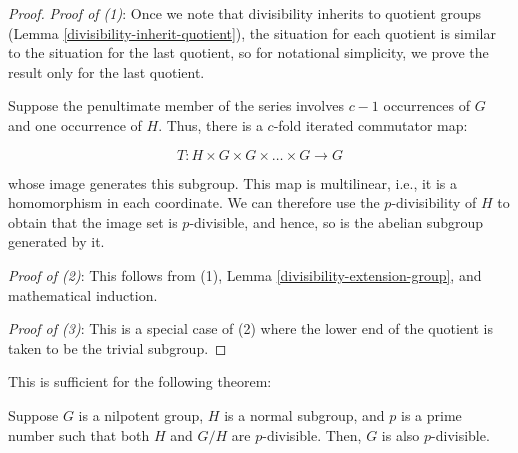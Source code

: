 \documentclass{ucetd}
\begin{document}
\begin{proof}
  {\em Proof of (1)}: Once we note that divisibility inherits to
  quotient groups (Lemma \ref{divisibility-inherit-quotient}), the
  situation for each quotient is similar to the situation for the last
  quotient, so for notational simplicity, we prove the result only for
  the last quotient.

  Suppose the penultimate member of the series involves $c - 1$
  occurrences of $G$ and one occurrence of $H$. Thus, there is a
  $c$-fold iterated commutator map:

  $$T: H \times G \times G \times \dots \times G \to G$$

  whose image generates this subgroup. This map is multilinear, i.e.,
  it is a homomorphism in each coordinate. We can therefore use the
  $p$-divisibility of $H$ to obtain that the image set is
  $p$-divisible, and hence, so is the abelian subgroup generated by
  it.

  {\em Proof of (2)}: This follows from (1), Lemma
  \ref{divisibility-extension-group}, and mathematical induction.

  {\em Proof of (3)}: This is a special case of (2) where the lower
  end of the quotient is taken to be the trivial subgroup.
\end{proof}

This is sufficient for the following theorem:

\begin{theorem}\label{thm:divisibility-extension-group-general}
  Suppose $G$ is a nilpotent group, $H$ is a normal subgroup, and $p$
  is a prime number such that both $H$ and $G/H$ are
  $p$-divisible. Then, $G$ is also $p$-divisible.
\end{theorem}
\end{document}
